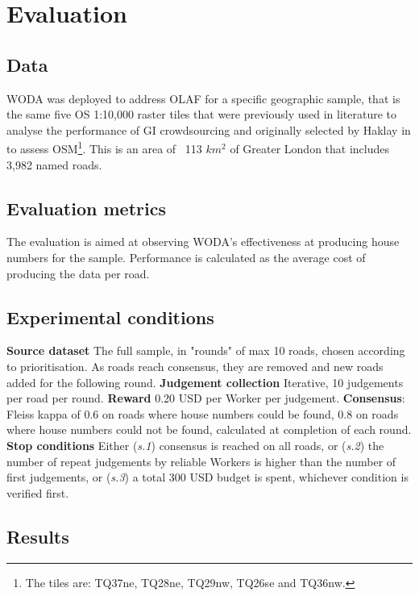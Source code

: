 \section{Evaluation}

\subsection{Data}

WODA was deployed to address OLAF for a specific geographic sample, that is the same five OS 1:10,000 raster tiles that were previously used in literature to analyse the performance of GI crowdsourcing and originally selected by Haklay in \cite{Haklay:2010vs} to assess OSM\footnote{The tiles are: TQ37ne, TQ28ne, TQ29nw, TQ26se and TQ36nw.}. This is an area of ~113 $ km^2 $ of Greater London that includes 3,982 named roads. 

\subsection{Evaluation metrics}

The evaluation is aimed at observing WODA's effectiveness at producing house numbers for the sample. Performance is calculated as the average cost of producing the data per road. 

\subsection{Experimental conditions}

\textbf{Source dataset} The full sample, in "rounds" of max 10 roads, chosen according to prioritisation. As roads reach consensus, they are removed and new roads added for the following round.
\textbf{Judgement collection} Iterative, 10 judgements per road per round.
\textbf{Reward} 0.20 USD per Worker per judgement.
\textbf{Consensus}: Fleiss kappa of 0.6 on roads where house numbers could be found, 0.8 on roads where house numbers could not be found, calculated at completion of each round. 
\textbf{Stop conditions} Either ({\it s.1}) consensus is reached on all roads, or ({\it s.2}) the number of repeat judgements by reliable Workers is higher than the number of first judgements, or ({\it s.3}) a total 300 USD budget is spent, whichever condition is verified first.

\subsection{Results}

